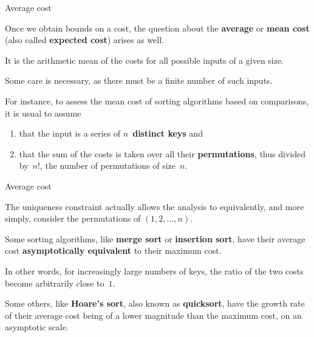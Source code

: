 %
\begin{frame}{Average cost}

  Once we obtain bounds on a cost, the question about the
  \textbf{average} or \textbf{mean cost} (also called \textbf{expected
    cost}) arises as well.

  \bigskip

  It is the arithmetic mean of the costs for all possible inputs of a
  given size.

  \bigskip

  Some care is necessary, as there must be a finite number of such
  inputs.

  \bigskip

  For instance, to assess the mean cost of sorting algorithms based on
  comparisons, it is usual to assume
  \begin{enumerate}

    \item that the input is a series of \(n\)~\textbf{distinct keys} and

    \item that the sum of the costs is taken over all their
      \textbf{permutations}, thus divided by~\(n!\), the number of
      permutations of size~\(n\).

  \end{enumerate}

\end{frame}

%
\begin{frame}{Average cost}

  The uniqueness constraint actually allows the analysis to
  equivalently, and more simply, consider the permutations of
  \((1,2,\dots,n)\).

  \bigskip

  Some sorting algorithms, like \textbf{merge sort} or
  \textbf{insertion sort}, have their average cost
  \textbf{asymptotically equivalent} to their maximum cost.

  \bigskip

  In other words, for increasingly large numbers of keys, the ratio of
  the two costs become arbitrarily close to~\(1\).

  \bigskip

  Some others, like \textbf{Hoare's sort}, also known as
  \textbf{quicksort}, have the growth rate of their average cost being
  of a lower magnitude than the maximum cost, on an asymptotic scale.

\end{frame}

